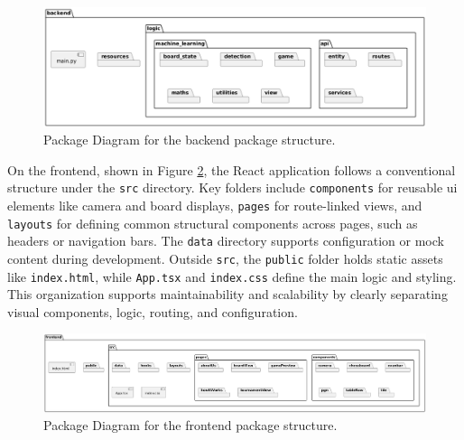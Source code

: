 \begin{figure}[h!]
    \centering
    \includegraphics[width=\linewidth]{figures/results/uml/package-backend.png}
    \caption[Package Diagram for Backend]{Package Diagram for the backend package structure.}
    \label{fig:package-backend}
\end{figure}

On the frontend, shown in Figure \ref{fig:package-frontend}, the React application follows a conventional structure under the \texttt{src} directory. Key folders include \texttt{components} for reusable \gls{ui} elements like camera and board displays, \texttt{pages} for route-linked views, and \texttt{layouts} for defining common structural components across pages, such as headers or navigation bars. The \texttt{data} directory supports configuration or mock content during development. Outside \texttt{src}, the \texttt{public} folder holds static assets like \texttt{index.html}, while \texttt{App.tsx} and \texttt{index.css} define the main logic and styling. This organization supports maintainability and scalability by clearly separating visual components, logic, routing, and configuration.

\begin{figure}[h!]
    \centering
    \includegraphics[width=\linewidth]{figures/results/uml/package-frontend.png}
    \caption[Package Diagram for Frontend]{Package Diagram for the frontend package structure.}
    \label{fig:package-frontend}
\end{figure}



